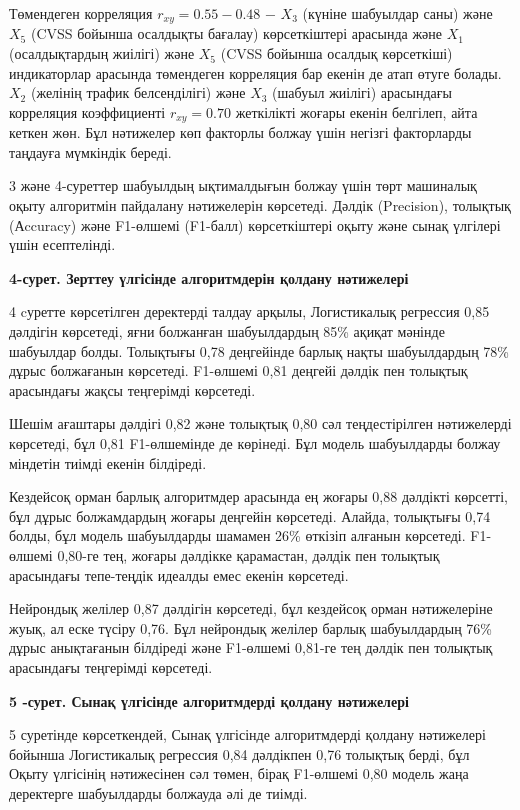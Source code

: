 Төмендеген корреляция \(r_{xy} = 0.55 - 0.48\) − \(X_{3}\) (күніне
шабуылдар саны) және \(X_{5}\) (CVSS бойынша осалдықты бағалау)
көрсеткіштері арасында және \(X_{1}\) (осалдықтардың жиілігі) және
\(X_{5}\) (CVSS бойынша осалдық көрсеткіші) индикаторлар арасында
төмендеген корреляция бар екенін де атап өтуге болады. \(X_{2}\)
(желінің трафик белсенділігі) және \(X_{3}\) (шабуыл жиілігі) арасындағы
корреляция коэффициенті \(r_{xy} = 0.70\) жеткілікті жоғары екенін
белгілеп, айта кеткен жөн. Бұл нәтижелер көп факторлы болжау үшін
негізгі факторларды таңдауға мүмкіндік береді.

3 және 4-суреттер шабуылдың ықтималдығын болжау үшін төрт машиналық
оқыту алгоритмін пайдалану нәтижелерін көрсетеді. Дәлдік (Precision),
толықтық (Аccuracy) және F1-өлшемі (F1-балл) көрсеткіштері оқыту және
сынақ үлгілері үшін есептелінді.

{\bfseries 4-сурет. Зерттеу үлгісінде алгоритмдерін қолдану нәтижелері}

4 cуретте көрсетілген деректерді талдау арқылы, Логистикалық регрессия
0,85 дәлдігін көрсетеді, яғни болжанған шабуылдардың 85\% ақиқат мәнінде
шабуылдар болды. Толықтығы 0,78 деңгейінде барлық нақты шабуылдардың
78\% дұрыс болжағанын көрсетеді. F1-өлшемі 0,81 деңгейі дәлдік пен
толықтық арасындағы жақсы теңгерімді көрсетеді.

Шешім ағаштары дәлдігі 0,82 және толықтық 0,80 сәл теңдестірілген
нәтижелерді көрсетеді, бұл 0,81 F1-өлшемінде де көрінеді. Бұл модель
шабуылдарды болжау міндетін тиімді екенін білдіреді.

Кездейсоқ орман барлық алгоритмдер арасында ең жоғары 0,88 дәлдікті
көрсетті, бұл дұрыс болжамдардың жоғары деңгейін көрсетеді. Алайда,
толықтығы 0,74 болды, бұл модель шабуылдарды шамамен 26\% өткізіп
алғанын көрсетеді. F1-өлшемі 0,80-ге тең, жоғары дәлдікке қарамастан,
дәлдік пен толықтық арасындағы тепе-теңдік идеалды емес екенін
көрсетеді.

Нейрондық желілер 0,87 дәлдігін көрсетеді, бұл кездейсоқ орман
нәтижелеріне жуық, ал еске түсіру 0,76. Бұл нейрондық желілер барлық
шабуылдардың 76\% дұрыс анықтағанын білдіреді және F1-өлшемі 0,81-ге тең
дәлдік пен толықтық арасындағы теңгерімді көрсетеді.

{\bfseries 5 -сурет. Сынақ үлгісінде алгоритмдерді қолдану нәтижелері}

5 суретінде көрсеткендей, Сынақ үлгісінде алгоритмдерді қолдану
нәтижелері бойынша Логистикалық регрессия 0,84 дәлдікпен 0,76 толықтық
берді, бұл Оқыту үлгісінің нәтижесінен сәл төмен, бірақ F1-өлшемі 0,80
модель жаңа деректерге шабуылдарды болжауда әлі де тиімді.

